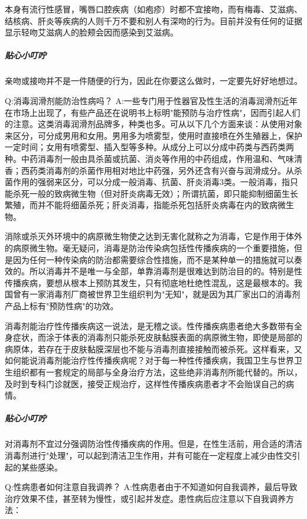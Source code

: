 \documentclass[12pt,UTF8]{ctexbook}
\begin{document}
本身有流行性感冒，嘴唇口腔疾病（如疱疹）时都不宜接吻，而有梅毒、艾滋病、结核病、肝炎等疾病的人则千万不要和别人有深吻的行为。目前并没有任何的证据显示轻吻艾滋病人的脸颊会因而感染到艾滋病。

\subparagraph{贴心小叮咛}

亲吻或接吻并不是一件随便的行为，因此在你要这么做时，一定要先好好地想过。

Q:消毒润滑剂能防治性病吗？
A:一些专门用于性器官及性生活的消毒润滑剂近年在市场上出现了，有些产品还在说明书上标明"能预防与治疗性病"，因而引起人们的注意。这类消毒润滑剂品牌多，种类也多。可从以下几个方面来谈：从使用对象来区分，可分成男用和女用。男用多为喷雾型，使用时直接喷在外生殖器上，保护一定时间；女用有喷雾型、插入型等多种。从成分上可以分成中药类与西药类两种。中药消毒剂一般由具杀菌或抗菌、消炎等作用的中药组成，作用温和、气味清香；西药类消毒剂的杀菌作用相对地比中药强，另外还含有兴奋与润滑成分。从杀菌作用的强弱来区分，可以分成一般消毒、抗菌、肝炎消毒3类。一般消毒，指只能杀死一般的致病微生物（但对肝炎病毒无效）；所谓抗菌，即只能抑制细菌生长繁殖，而并不能将细菌杀死；肝炎消毒，指能杀死包括肝炎病毒在内的致病微生物。

消除或杀灭外环境中的病原微生物使之达到无害化就称之为消毒，它是作用于体外的病原微生物。毫无疑问，消毒是防治传染病包括性传播疾病的一个重要措施，但是因为任何一种传染病的防治都需要综合性措施，而不是某种单一的措施就可以奏效的。所以消毒并不是唯一与全部，单靠消毒剂是很难达到防治目的的。特别是性传播疾病，要想从根本上预防其发生，只有彻底地杜绝性混乱，这是最根本的。我国曾有一家消毒剂厂商被世界卫生组织判为"无知"，就是因为其厂家出口的消毒剂产品上标有"预防性病"的功效。

消毒剂能治疗性传播疾病这一说法，是无稽之谈。性传播疾病患者绝大多数带有全身症状，而涂于体表的消毒剂只能杀死皮肤黏膜表面的病原微生物，即使是局部的病原体，若存在于皮肤黏膜深层也不能与消毒剂直接接触而被杀死。这样看来，又如何能说消毒剂能治疗性传播疾病呢？对于每一种性传播疾病，我国卫生与世界卫生组织都有一套规定的局部与全身治疗方法，这些绝非消毒剂所能代替的。所以，及时到专科门诊就医，接受正规治疗，这样性传播疾病患者才不会贻误自己的病情。

\subparagraph{贴心小叮咛}

对消毒剂不宜过分强调防治性传播疾病的作用。但是，在性生活前，用合适的清洁消毒剂进行"处理"，可以起到清洁卫生作用，并有可能在一定程度上减少由性交引起的某些感染。

Q:性病患者如何注意自我调养？
A:性病患者由于不知道如何自我调养，最后导致治疗效果不佳，甚至转为慢性，或引起并发症。患性病后应注意以下自我调养方法：
\end{document}
